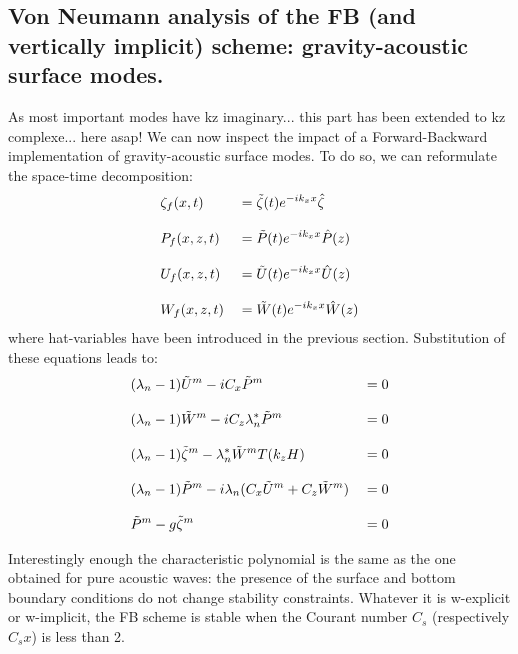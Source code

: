 \documentclass[a4paper]{article}
\numberwithin{equation}{section}
\begin{document}
\subsection{Von Neumann analysis of the FB (and vertically implicit) scheme: gravity-acoustic surface modes.}
\label{Subsec-VNGV}

As most important modes have kz imaginary... this part has been extended to kz complexe... here asap! 
We can now inspect the impact of a Forward-Backward implementation of gravity-acoustic surface modes. To do so, we can reformulate the space-time decomposition:
\begin{equation}
   \begin{split}
    \displaystyle
     &\zeta_f(x,t)&&=\tilde{\zeta}(t) e^{-i k_x x}\hat{\zeta}\\[3mm]
     &P_f(x,z,t)  &&=\tilde{P}(t) e^{-i k_x x}\hat{P}(z)\\[3mm]
     &U_f(x,z,t)  &&=\tilde{U}(t) e^{-i k_x x}\hat{U}(z)\\[3mm]
     &W_f(x,z,t)  &&=\tilde{W}(t) e^{-i k_x x}\hat{W}(z)
   \end{split}
\end{equation}
where hat-variables have been introduced in the previous section. Substitution of these equations leads to:
\begin{equation}
   \begin{split}
    \displaystyle
    & (\lambda_{n}-1) \tilde{U}^{m}-i C_x \tilde{P}^{m} &&=0\\[3mm]
    \displaystyle
    & (\lambda_{n}-1) \tilde{W}^{m}-i C_z \lambda_{n}^* \tilde{P}^{m} &&=0\\[3mm]
    \displaystyle
    & (\lambda_{n}-1) \tilde{\zeta}^m-\lambda_{n}^* \tilde{W}^{m} T(k_z H) &&=0 \\[3mm]
    \displaystyle
    & (\lambda_{n}-1) \tilde{P}^{m}-i \lambda_{n} \huge( C_x \tilde{U}^{m}+ C_z \tilde{W}^{m}\huge) &&=0 \\[3mm]
    \displaystyle
    &\tilde{P}^{m}-g\tilde{\zeta}^{m} &&=0
   \end{split}
\end{equation}

Interestingly enough the characteristic polynomial is the same as the one obtained for pure acoustic waves: the presence of the surface and bottom boundary conditions do not change stability constraints. Whatever it is w-explicit or w-implicit, the FB scheme is stable when the Courant number $C_s$ (respectively $C_sx$) is less than 2.
\end{document}
